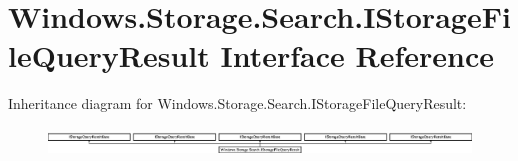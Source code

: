 \hypertarget{interface_windows_1_1_storage_1_1_search_1_1_i_storage_file_query_result}{}\section{Windows.\+Storage.\+Search.\+I\+Storage\+File\+Query\+Result Interface Reference}
\label{interface_windows_1_1_storage_1_1_search_1_1_i_storage_file_query_result}
Inheritance diagram for Windows.\+Storage.\+Search.\+I\+Storage\+File\+Query\+Result\+:\begin{figure}[H]
\begin{center}
\leavevmode
\includegraphics[height=0.734426cm]{interface_windows_1_1_storage_1_1_search_1_1_i_storage_file_query_result}
\end{center}
\end{figure}
